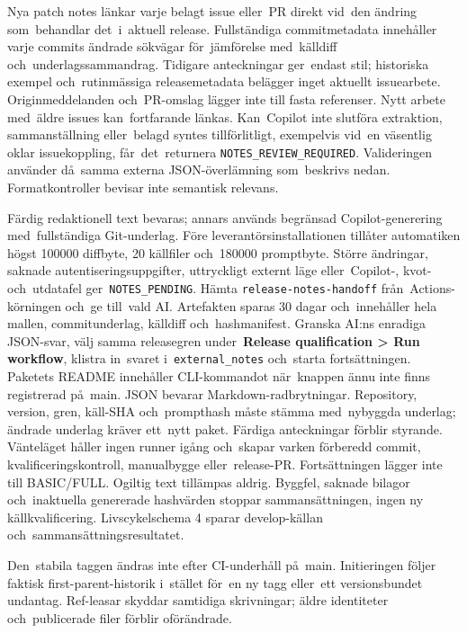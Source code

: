 \documentclass[11pt,a4paper]{article}
\newcommand{\filepath}[1]{\path{#1}}
\newcommand{\ui}[1]{\textbf{#1}}
\newcommand{\codeword}[1]{\nolinkurl{#1}}
\begin{document}
Nya patch notes länkar varje belagt issue eller~PR direkt vid~den ändring
som~behandlar det~i~aktuell release. Fullständiga commitmetadata innehåller
varje
commits ändrade sökvägar för~jämförelse med~källdiff och~underlagssammandrag.
Tidigare anteckningar ger~endast stil; historiska exempel och~rutinmässiga
releasemetadata belägger inget aktuellt issuearbete. Originmeddelanden
och~PR-omslag lägger inte till fasta referenser. Nytt arbete med~äldre issues
kan~fortfarande länkas. Kan~Copilot inte slutföra extraktion, sammanställning
eller~belagd syntes tillförlitligt, exempelvis vid~en väsentlig oklar
issuekoppling, får~det~returnera \codeword{NOTES_REVIEW_REQUIRED}.
Valideringen använder då~samma externa JSON-överlämning som~beskrivs nedan.
Formatkontroller bevisar inte semantisk relevans.

Färdig redaktionell text bevaras; annars används begränsad Copilot-generering
med~fullständiga Git-underlag. Före leverantörsinstallationen tillåter
automatiken
högst 100000 diffbyte, 20 källfiler och~180000 promptbyte. Större ändringar,
saknade autentiseringsuppgifter, uttryckligt externt läge eller~Copilot-,
kvot- och~utdatafel ger~\codeword{NOTES_PENDING}. Hämta
\codeword{release-notes-handoff} från~Actions-körningen och~ge
\filepath{prompt.txt} till~vald AI. Artefakten sparas 30 dagar och~innehåller
hela mallen, commitunderlag, källdiff och~hashmanifest. Granska AI:ns enradiga
JSON-svar, välj samma releasegren under~\ui{Release qualification > Run
workflow},
klistra in~svaret i~\codeword{external_notes} och~starta fortsättningen.
Paketets README innehåller CLI-kommandot när~knappen ännu inte finns registrerad
på~main. JSON bevarar Markdown-radbrytningar. Repository, version, gren,
käll-SHA och~prompthash måste stämma med~nybyggda underlag; ändrade underlag
kräver ett~nytt paket. Färdiga anteckningar förblir styrande. Vänteläget håller
ingen runner igång och~skapar varken förberedd commit, kvalificeringskontroll,
manualbygge eller~release-PR. Fortsättningen lägger inte till BASIC/FULL.
Ogiltig text tillämpas aldrig.
Byggfel, saknade bilagor och~inaktuella genererade hashvärden stoppar
sammansättningen, ingen ny källkvalificering. Livscykelschema 4 sparar
develop-källan och~sammansättningsresultatet.

Den~stabila taggen ändras inte efter CI-underhåll på~main.
Initieringen följer faktisk first-parent-historik i~stället för~en ny tagg
eller~ett versionsbundet undantag. Ref-leasar skyddar samtidiga skrivningar;
äldre identiteter och~publicerade filer förblir oförändrade.
\end{document}
